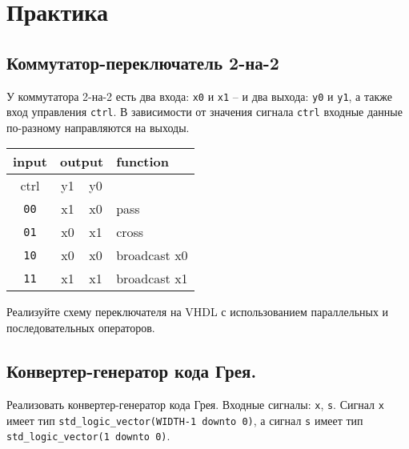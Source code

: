 \section{Практика}
\subsection{Коммутатор-переключатель 2-на-2}
У коммутатора 2-на-2 есть два входа: \lstinline?x0? и \lstinline?x1? – и два выхода: \lstinline?y0? и \lstinline?y1?, а также вход управления \lstinline?ctrl?. В зависимости от значения сигнала \lstinline?ctrl? входные данные по-разному направляются на выходы.
\begin{table}[h]
\centering
\begin{tabular}{|c|c|c|l|}
\hline
input       & \multicolumn{2}{c|}{output} & function     \\ \hline
ctrl        & y1 & y0                    &              \\ \hline
\texttt{00} & x1 & x0                    & pass         \\
\texttt{01} & x0 & x1                    & cross        \\
\texttt{10} & x0 & x0                    & broadcast x0 \\
\texttt{11} & x1 & x1                    & broadcast x1 \\
\hline
\end{tabular}
\end{table}

 Реализуйте схему переключателя на VHDL с использованием параллельных и последовательных операторов.

\subsection{Конвертер-генератор кода Грея.}
 Реализовать конвертер-генератор кода Грея. Входные сигналы: \lstinline?x?, \lstinline?s?. Сигнал \lstinline?x? имеет тип \lstinline?std_logic_vector(WIDTH-1 downto 0)?, а сигнал \lstinline?s? имеет тип \lstinline?std_logic_vector(1 downto 0)?.

